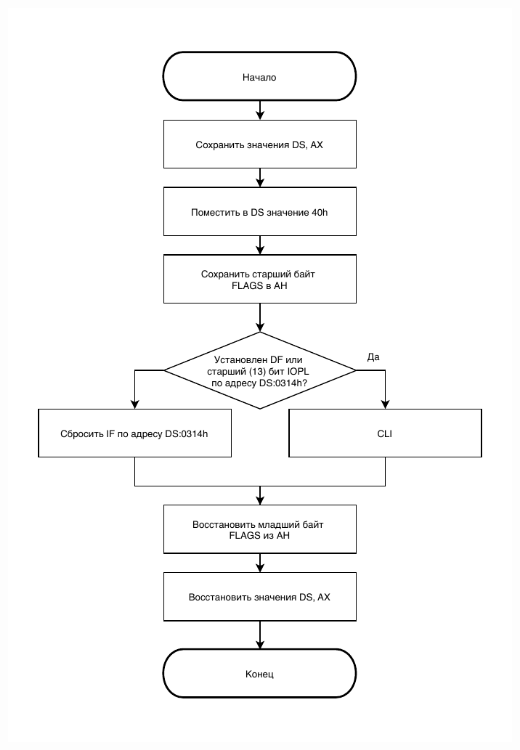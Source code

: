 \documentclass[a4paper,14pt]{article}
\begin{document}
\begin{flushright}
	\begin{center}
		\includegraphics[height=0.8\textheight]{assets/sub_2.pdf}
	\end{center}
	\clearpage
\end{flushright}
	
\end{document}
